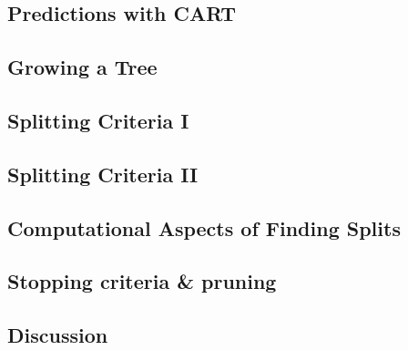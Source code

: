 

\subsection{Predictions with CART}


\subsection{Growing a Tree}


\subsection{Splitting Criteria I}


\subsection{Splitting Criteria II}


\subsection{Computational Aspects of Finding Splits}


\subsection{Stopping criteria \& pruning}


\subsection{Discussion}

